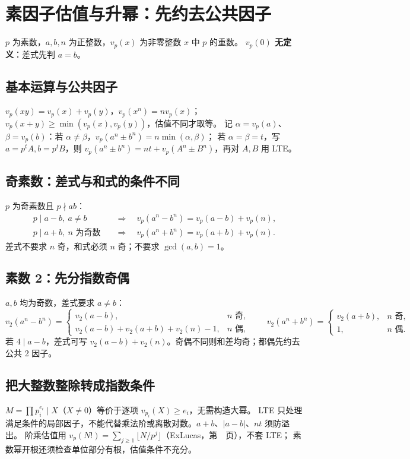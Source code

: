 \section{素因子估值与升幂：先约去公共因子}\label{knowledge-lte}
$p$ 为素数，$a,b,n$ 为正整数，$v_p(x)$ 为非零整数 $x$ 中 $p$ 的重数。
\textbf{$v_p(0)$ 无定义}：差式先判 $a=b$。

\subsection{基本运算与公共因子}
$v_p(xy)=v_p(x)+v_p(y)$，$v_p(x^n)=nv_p(x)$；$v_p(x+y)\ge\min(v_p(x),v_p(y))$，估值不同才取等。
记 $\alpha=v_p(a)$、$\beta=v_p(b)$：若 $\alpha\ne\beta$，$v_p(a^n\pm b^n)=n\min(\alpha,\beta)$；
若 $\alpha=\beta=t$，写 $a=p^tA,b=p^tB$，则 $v_p(a^n\pm b^n)=nt+v_p(A^n\pm B^n)$，再对 $A,B$ 用 LTE。

\subsection{奇素数：差式与和式的条件不同}
$p$ 为奇素数且 $p\nmid ab$：
\[
\begin{aligned}
p\mid a-b,\ a\ne b
&\quad\Longrightarrow\quad v_p(a^n-b^n)=v_p(a-b)+v_p(n),\\
p\mid a+b,\ n\text{ 为奇数}
&\quad\Longrightarrow\quad v_p(a^n+b^n)=v_p(a+b)+v_p(n).
\end{aligned}
\]
差式不要求 $n$ 奇，和式必须 $n$ 奇；不要求 $\gcd(a,b)=1$。

\subsection{素数 2：先分指数奇偶}
$a,b$ 均为奇数，差式要求 $a\ne b$：
\[
v_2(a^n-b^n)=
\begin{cases}
v_2(a-b),&n\text{ 奇},\\
v_2(a-b)+v_2(a+b)+v_2(n)-1,&n\text{ 偶},
\end{cases}\qquad
v_2(a^n+b^n)=
\begin{cases}
v_2(a+b),&n\text{ 奇},\\
1,&n\text{ 偶}.
\end{cases}
\]
若 $4\mid a-b$，差式可写 $v_2(a-b)+v_2(n)$。奇偶不同则和差均奇；都偶先约去公共 2 因子。

\subsection{把大整数整除转成指数条件}
$M=\prod p_i^{e_i}\mid X$（$X\ne0$）等价于逐项 $v_{p_i}(X)\ge e_i$，无需构造大幂。
LTE 只处理满足条件的局部因子，不能代替乘法阶或离散对数。$a+b$、$|a-b|$、$nt$ 须防溢出。
阶乘估值用 $v_p(N!)=\sum_{j\ge1}\lfloor N/p^j\rfloor$（ExLucas，第~\pageref{compact-ExLucas}~页），不套 LTE；
素数幂开根还须检查单位部分有根，估值条件不充分。
